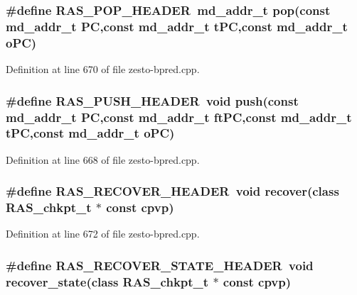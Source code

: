 \subsubsection[{RAS\_\-POP\_\-HEADER}]{\setlength{\rightskip}{0pt plus 5cm}\#define RAS\_\-POP\_\-HEADER~{\bf md\_\-addr\_\-t} pop(const {\bf md\_\-addr\_\-t} PC,const {\bf md\_\-addr\_\-t} tPC,const {\bf md\_\-addr\_\-t} oPC)}\label{zesto-bpred_8cpp_505ed9f484cc5de744d3ddfc0956991d}




Definition at line 670 of file zesto-bpred.cpp.
\subsubsection[{RAS\_\-PUSH\_\-HEADER}]{\setlength{\rightskip}{0pt plus 5cm}\#define RAS\_\-PUSH\_\-HEADER~void push(const {\bf md\_\-addr\_\-t} PC,const {\bf md\_\-addr\_\-t} ftPC,const {\bf md\_\-addr\_\-t} tPC,const {\bf md\_\-addr\_\-t} oPC)}\label{zesto-bpred_8cpp_2f03b49d201df2355eeda691eb6264b3}




Definition at line 668 of file zesto-bpred.cpp.
\subsubsection[{RAS\_\-RECOVER\_\-HEADER}]{\setlength{\rightskip}{0pt plus 5cm}\#define RAS\_\-RECOVER\_\-HEADER~void recover(class {\bf RAS\_\-chkpt\_\-t} $\ast$ const cpvp)}\label{zesto-bpred_8cpp_d2a940acf28d0ef334e31c72d6fd187f}




Definition at line 672 of file zesto-bpred.cpp.
\subsubsection[{RAS\_\-RECOVER\_\-STATE\_\-HEADER}]{\setlength{\rightskip}{0pt plus 5cm}\#define RAS\_\-RECOVER\_\-STATE\_\-HEADER~void recover\_\-state(class {\bf RAS\_\-chkpt\_\-t} $\ast$ const cpvp)}\label{zesto-bpred_8cpp_b5ce24775ee09ef37f6ddcea44475d9f}




